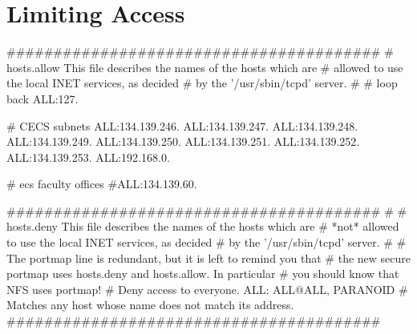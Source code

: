 \chapter{Limiting Access}

########################################
# hosts.allow	This file describes the names of the hosts which are
#		allowed to use the local INET services, as decided
#		by the '/usr/sbin/tcpd' server.
#
# loop back
ALL:127.

# CECS subnets
ALL:134.139.246.
ALL:134.139.247.
ALL:134.139.248.
ALL:134.139.249.
ALL:134.139.250.
ALL:134.139.251.
ALL:134.139.252.
ALL:134.139.253.
ALL:192.168.0.

# ecs faculty offices
#ALL:134.139.60.

########################################
#
# hosts.deny	This file describes the names of the hosts which are
#		*not* allowed to use the local INET services, as decided
#		by the '/usr/sbin/tcpd' server.
#
# The portmap line is redundant, but it is left to remind you that
# the new secure portmap uses hosts.deny and hosts.allow.  In particular
# you should know that NFS uses portmap!
# Deny access to everyone.
ALL: ALL@ALL, PARANOID # Matches any host whose name does not match its address.
########################################

